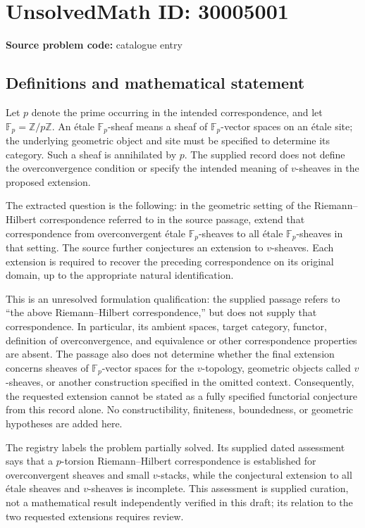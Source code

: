 \documentclass[11pt]{article}
\begin{document}
\section*{UnsolvedMath ID: 30005001}
\textbf{Source problem code:} catalogue entry
\subsection{Definitions and mathematical statement}
Let \(p\) denote the prime occurring in the intended correspondence, and let \(\mathbb F_p=\mathbb Z/p\mathbb Z\). An étale \(\mathbb F_p\)-sheaf means a sheaf of \(\mathbb F_p\)-vector spaces on an étale site; the underlying geometric object and site must be specified to determine its category. Such a sheaf is annihilated by \(p\). The supplied record does not define the overconvergence condition or specify the intended meaning of \(v\)-sheaves in the proposed extension.

The extracted question is the following: in the geometric setting of the Riemann--Hilbert correspondence referred to in the source passage, extend that correspondence from overconvergent étale \(\mathbb F_p\)-sheaves to all étale \(\mathbb F_p\)-sheaves in that setting. The source further conjectures an extension to \(v\)-sheaves. Each extension is required to recover the preceding correspondence on its original domain, up to the appropriate natural identification.

This is an unresolved formulation qualification: the supplied passage refers to ``the above Riemann--Hilbert correspondence,'' but does not supply that correspondence. In particular, its ambient spaces, target category, functor, definition of overconvergence, and equivalence or other correspondence properties are absent. The passage also does not determine whether the final extension concerns sheaves of \(\mathbb F_p\)-vector spaces for the \(v\)-topology, geometric objects called \(v\)-sheaves, or another construction specified in the omitted context. Consequently, the requested extension cannot be stated as a fully specified functorial conjecture from this record alone. No constructibility, finiteness, boundedness, or geometric hypotheses are added here.

The registry labels the problem partially solved. Its supplied dated assessment says that a \(p\)-torsion Riemann--Hilbert correspondence is established for overconvergent sheaves and small \(v\)-stacks, while the conjectural extension to all étale sheaves and \(v\)-sheaves is incomplete. This assessment is supplied curation, not a mathematical result independently verified in this draft; its relation to the two requested extensions requires review.
\end{document}
